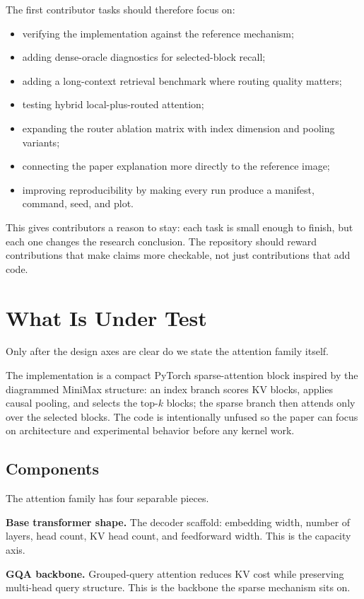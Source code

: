 \documentclass[11pt]{article}
\begin{document}
The first contributor tasks should therefore focus on:
\begin{itemize}[leftmargin=1.25em]
  \item verifying the implementation against the reference mechanism;
  \item adding dense-oracle diagnostics for selected-block recall;
  \item adding a long-context retrieval benchmark where routing quality matters;
  \item testing hybrid local-plus-routed attention;
  \item expanding the router ablation matrix with index dimension and pooling variants;
  \item connecting the paper explanation more directly to the reference image;
  \item improving reproducibility by making every run produce a manifest, command, seed, and plot.
\end{itemize}

This gives contributors a reason to stay: each task is small enough to finish, but each one changes the research conclusion.
The repository should reward contributions that make claims more checkable, not just contributions that add code.

\section{What Is Under Test}
Only after the design axes are clear do we state the attention family itself.

The implementation is a compact PyTorch sparse-attention block inspired by the diagrammed MiniMax structure:
an index branch scores KV blocks, applies causal pooling, and selects the top-$k$ blocks;
the sparse branch then attends only over the selected blocks.
The code is intentionally unfused so the paper can focus on architecture and experimental behavior before any kernel work.

\subsection{Components}
The attention family has four separable pieces.

\textbf{Base transformer shape.} The decoder scaffold: embedding width, number of layers, head count, KV head count, and feedforward width. This is the capacity axis.

\textbf{GQA backbone.} Grouped-query attention reduces KV cost while preserving multi-head query structure. This is the backbone the sparse mechanism sits on.
\end{document}
